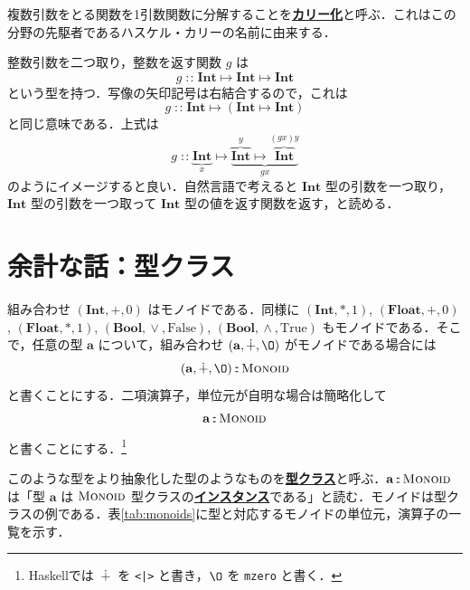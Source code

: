 \documentclass[a4paper,twocolumn]{jsbook}
\newcommand{\programminglanguage}[1]{\textsf{#1}}
\newcommand{\haskell}{\programminglanguage{Haskell}}
\newcommand{\keyword}[1]{{\underline{\textbf{#1}}}}
\newcommand{\code}[1]{\texttt{#1}}
\newcommand{\mSpecialConst}[1]{\mathrm{#1}} %
\newcommand{\mFalse}{\mSpecialConst{False}}
\newcommand{\mTrue}{\mSpecialConst{True}}
\newcommand{\mZero}{\O}
\DeclareMathOperator{\mIn}{{:\!:}}
\DeclareMathOperator{\mLogicalAnd}{\wedge}
\DeclareMathOperator{\mLogicalOr}{\vee}
\DeclareMathOperator{\mMapsTo}{\mapsto}
\DeclareMathOperator{\mPlus}{\dotplus}
\newcommand{\mType}[1]{\mathbf{#1}}
\newcommand{\mTupleWith}[1]{\left(#1\right)}
\newcommand{\mBoolType}{\mType{Bool}}
\newcommand{\mFloatType}{\mType{Float}}
\newcommand{\mIntType}{\mType{Int}}
\newcommand{\mSpecialTypeClass}[1]{\textsc{#1}} %
\newcommand{\mMonoidTypeClass}{\mSpecialTypeClass{Monoid}}
\newcommand{\mProj}[2]{#1\mMapsTo#2}
\begin{document}
複数引数をとる関数を1引数関数に分解することを\keyword{カリー化}と呼ぶ．これはこの分野の先駆者であるハスケル・カリーの名前に由来する．


整数引数を二つ取り，整数を返す関数 $g$ は
\begin{equation}
g\mIn\mProj{\mIntType}{\mProj{\mIntType}{\mIntType}}
\end{equation}
という型を持つ．写像の矢印記号は右結合するので，これは
\begin{equation}
g\mIn\mProj{\mIntType}{\left(\mProj{\mIntType}{\mIntType}\right)}
\end{equation}
と同じ意味である．上式は
\begin{equation*}
g\mIn
\underbrace{\mIntType}_x
\mMapsTo
\underbrace{\overbrace{\mIntType}^y
\mMapsTo\overbrace{\mIntType}^{(gx)y}}_{gx}
\end{equation*}
のようにイメージすると良い．自然言語で考えると $\mIntType$ 型の引数を一つ取り，$\mIntType$ 型の引数を一つ取って $\mIntType$ 型の値を返す関数を返す，と読める．


\section{余計な話：型クラス}

組み合わせ $\mTupleWith{\mIntType,+,0}$ はモノイドである．同様に $\mTupleWith{\mIntType,*,1}$, $\mTupleWith{\mFloatType,+,0}$, $\mTupleWith{\mFloatType,*,1}$, $\mTupleWith{\mBoolType,\mLogicalOr,\mFalse}$, $\mTupleWith{\mBoolType,\mLogicalAnd,\mTrue}$ もモノイドである．そこで，任意の型 $\mType{a}$ について，組み合わせ $\mTupleWith{\mType{a},\mPlus,\mZero}$ がモノイドである場合には
\begin{equation}
\mTupleWith{\mType{a},\mPlus,\mZero}\mIn\mMonoidTypeClass
\end{equation}
と書くことにする．二項演算子，単位元が自明な場合は簡略化して
\begin{equation}
\mType{a}\mIn\mMonoidTypeClass
\end{equation}
と書くことにする．\footnote{\haskell では $\mPlus$ を \code{<|>} と書き，$\mZero$ を \code{mzero} と書く．}

このような型をより抽象化した型のようなものを\keyword{型クラス}と呼ぶ．$\mType{a}\mIn\mMonoidTypeClass$ は「型 $\mType{a}$ は $\mMonoidTypeClass$ 型クラスの\keyword{インスタンス}である」と読む．モノイドは型クラスの例である．表\ref{tab:monoids}に型と対応するモノイドの単位元，演算子の一覧を示す．
\end{document}
